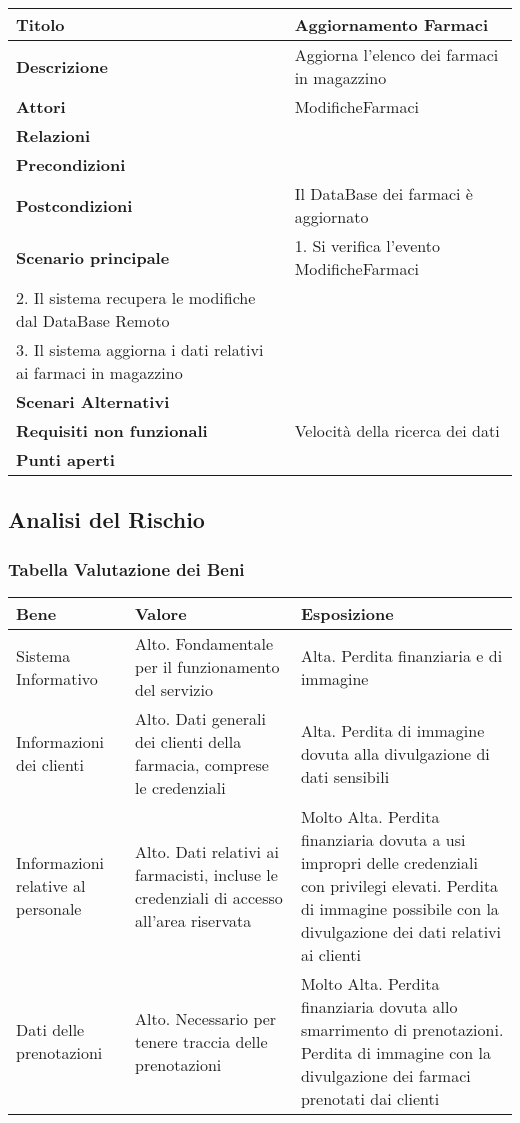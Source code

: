 \begin{tabular} {|P{4.5cm}|P{12.5cm}|}
\hline
  \textbf{Titolo} & Aggiornamento Farmaci\\
\hline
  \textbf{Descrizione} & Aggiorna l'elenco dei farmaci in magazzino\\
\hline
  \textbf{Attori} & ModificheFarmaci\\
\hline
  \textbf{Relazioni} &\\
\hline
  \textbf{Precondizioni} &\\
\hline
  \textbf{Postcondizioni} & Il DataBase dei farmaci è aggiornato\\
\hline
  \textbf{Scenario principale} & 1. Si verifica l'evento ModificheFarmaci \\ 2. Il sistema recupera le modifiche dal DataBase Remoto \\ 3. Il sistema aggiorna i dati relativi ai farmaci in magazzino\\
\hline
  \textbf{Scenari Alternativi} &\\
\hline
  \textbf{Requisiti non funzionali} & Velocità della ricerca dei dati\\
\hline
  \textbf{Punti aperti} &\\
\hline
\end{tabular}
\hfill
\break

\subsection{Analisi del Rischio}

\subsubsection{Tabella Valutazione dei Beni}

\begin{tabular} {|P{4cm}|P{6cm}|P{7cm}|}
\hline
  \textbf{Bene} & \textbf{Valore} & \textbf{Esposizione}\\
\hline
  Sistema Informativo & Alto. Fondamentale per il funzionamento del servizio & Alta. Perdita finanziaria e di immagine\\
\hline
  Informazioni dei clienti & Alto. Dati generali dei clienti della farmacia, comprese le credenziali & Alta. Perdita di immagine dovuta alla divulgazione di dati sensibili\\
\hline
  Informazioni relative al personale & Alto. Dati relativi ai farmacisti, incluse le credenziali di accesso all'area riservata & Molto Alta. Perdita finanziaria dovuta a usi impropri delle credenziali con privilegi elevati. Perdita di immagine possibile con la divulgazione dei dati relativi ai clienti\\
\hline
  Dati delle prenotazioni & Alto. Necessario per tenere traccia delle prenotazioni & Molto Alta. Perdita finanziaria dovuta allo smarrimento di prenotazioni. Perdita di immagine con la divulgazione dei farmaci prenotati dai clienti\\
\hline
\end{tabular}

